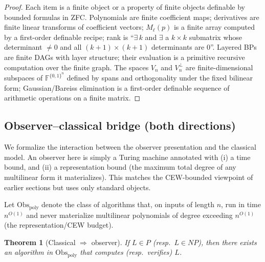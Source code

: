 \documentclass[12pt]{article}
\newtheorem{theorem}{Theorem}
\theoremstyle{definition}
\theoremstyle{definition}
\theoremstyle{remark}
\theoremstyle{remark}
\begin{document}
\begin{proof}
Each item is a finite object or a property of finite objects definable by bounded formulas in ZFC. Polynomials are finite coefficient maps; derivatives are finite linear transforms of coefficient vectors; $M_\ell(p)$ is a finite array computed by a first-order definable recipe; rank is ``$\exists\, k$ and $\exists$ a $k\times k$ submatrix whose determinant $\neq 0$ and all $(k+1)\times(k+1)$ determinants are $0$''. Layered BPs are finite DAGs with layer structure; their evaluation is a primitive recursive computation over the finite graph. The spaces $V_n$ and $V_n^{\perp}$ are finite-dimensional subspaces of $\mathbb{F}^{\{0,1\}^n}$ defined by spans and orthogonality under the fixed bilinear form; Gaussian/Bareiss elimination is a first-order definable sequence of arithmetic operations on a finite matrix.
\end{proof}

\subsection{Observer--classical bridge (both directions)}

We formalize the interaction between the observer presentation and the classical model. An observer here is simply a Turing machine annotated with (i) a time bound, and (ii) a representation bound (the maximum total degree of any multilinear form it materializes). This matches the CEW-bounded viewpoint of earlier sections but uses only standard objects.

Let $\mathrm{Obs}_{\mathrm{poly}}$ denote the class of algorithms that, on inputs of length $n$, run in time $n^{O(1)}$ and never materialize multilinear polynomials of degree exceeding $n^{O(1)}$ (the representation/CEW budget).

\begin{theorem}[Classical $\Rightarrow$ observer]\label{thm:classical-to-observer}
If $L\in P$ (resp.\ $L\in NP$), then there exists an algorithm in $\mathrm{Obs}_{\mathrm{poly}}$ that computes (resp.\ verifies) $L$.
\end{theorem}
\end{document}
